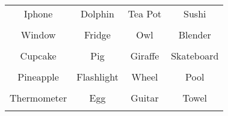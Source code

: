 \documentclass[12pt,a4paper]{article}
\begin{document}
\thispagestyle{empty}
\begin{table}[]
\centering
\Huge
\begin{tabular}{cccc}
 Iphone& Dolphin& Tea Pot& Sushi\\  & & & \\
 Window& Fridge& Owl& Blender\\  & & & \\
 Cupcake& Pig& Giraffe& Skateboard\\  & & & \\
 Pineapple& Flashlight& Wheel& Pool\\  & & & \\
 Thermometer& Egg& Guitar& Towel\\  & & & \\
\end{tabular}
\end{table}
\end{document}
